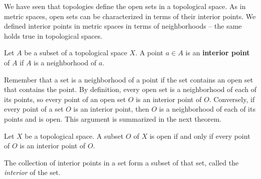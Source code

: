 \begin{comment}

\ActivitySolution

\ba
\item  To prove that $O$ is open, we can write $O$ as a union of open sets.

\item Let $a \in O$. Since $O$ is a neighborhood of $a$, there exists an open set $O_a$ such that $a \in O_a \subseteq O$.

\item We will show that 
\[\bigcup_{a \in O} O_a = O.\]
Since any union of open sets is an open set, this will verify that $O$ is an open set. Since $O_a \subseteq O$ for each $a \in O$, it follows that $\ds \bigcup_{a \in O} O_a \subseteq O$. Now let $x \in O$. Then $x \in O_x \subseteq \bigcup_{a \in O} O_a$ and $O \subseteq \bigcup_{a \in O} O_a$. 

\ea

\end{comment}


We have seen that topologies define the open sets in a topological space. As in metric spaces, open sets can be characterized in terms of their interior points. We defined interior points in metric spaces in terms of neighborhoods -- the same holds true in topological spaces. 

\begin{definition} Let $A$ be a subset of a topological space $X$. A point $a \in A$ is an \textbf{interior point} of $A$ if $A$ is a neighborhood of $a$.
\end{definition}

Remember that a set is a neighborhood of a point if the set contains an open set that contains the point. By definition, every open set is a neighborhood of each of its points, so every point of an open set $O$ is an interior point of $O$. Conversely, if every point of a set $O$ is an interior point, then $O$ is a neighborhood of each of its points and is open. This argument is summarized in the next theorem. 

\begin{theorem} Let $X$ be a topological space. A subset $O$ of $X$ is open if and only if every point of $O$ is an interior point of $O$. 
\end{theorem}

The collection of interior points in a set form a subset of that set, called the \emph{interior} of the set.

